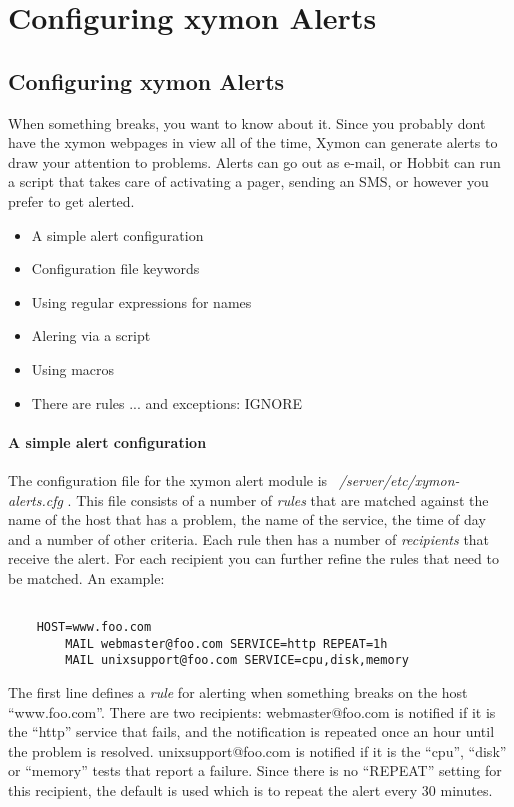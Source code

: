 \chapter{Configuring xymon Alerts}
\section{Configuring xymon Alerts}


 When something breaks, you want to know about it. Since you probably dont have the xymon webpages in view all of the time, Xymon can generate alerts to draw your attention to problems. Alerts can go out as e-mail, or Hobbit can run a script that takes care of activating a pager, sending an SMS, or however you prefer to get alerted.
\begin{itemize}
\item A simple alert configuration
\item Configuration file keywords
\item Using regular expressions for names
\item Alering via a script
\item Using macros
\item There are rules ... and exceptions: IGNORE

\end{itemize}
\subsubsection{A simple alert configuration}


 The configuration file for the xymon alert module is \emph{~/server/etc/xymon-alerts.cfg}
. This file consists of a number of \emph{rules}
 that are matched against the name of the host that has a problem, the name of the service, the time of day and a number of other criteria. Each rule then has a number of \emph{recipients}
 that receive the alert. For each recipient you can further refine the rules that need to be matched. An example:
\begin{verbatim}

	HOST=www.foo.com
		MAIL webmaster@foo.com SERVICE=http REPEAT=1h
		MAIL unixsupport@foo.com SERVICE=cpu,disk,memory

\end{verbatim}


 The first line defines a \emph{rule}
 for alerting when something breaks on the host ``www.foo.com''.
 There are two recipients: webmaster@foo.com is notified if it is the ``http'' service that fails, and the notification is repeated once an hour until the problem is resolved.
unixsupport@foo.com is notified if it is the ``cpu'', ``disk'' or ``memory'' tests that report a failure. Since there is no ``REPEAT'' setting for this recipient, the default is used which is to repeat the alert every 30 minutes.


